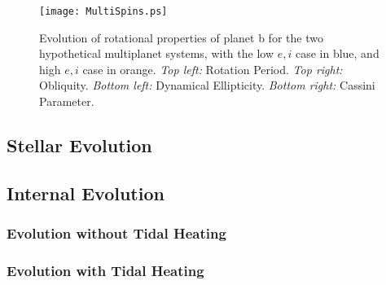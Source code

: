 \documentclass[preprint,12pt]{aastex}
\begin{document}
\begin{figure} 
\begin{center}
\texttt{[image: MultiSpins.ps]}
\end{center}
\caption{Evolution of rotational properties of planet b for the two hypothetical multiplanet systems, with the low $e,i$ case in blue, and high $e,i$ case in orange. {\it Top left:} Rotation Period. {\it Top right:} Obliquity. {\it Bottom left:} Dynamical Ellipticity. {\it Bottom right:} Cassini Parameter.}
\label{fig:MultiSpins}
\end{figure}




\subsection{Stellar Evolution}
\label{sec:results:stellar}



\subsection{Internal Evolution}
\label{sec:results:internal}

\subsubsection{Evolution without Tidal Heating}
\label{sec:results:internal:notides}



\subsubsection{Evolution with Tidal Heating}
\label{sec:results:internal:tides}

\end{document}
